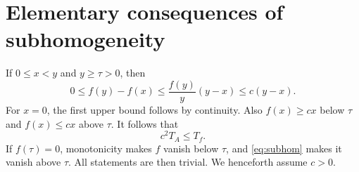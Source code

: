 \documentclass[11pt]{article}
\theoremstyle{definition}
\newcommand{\TA}{T_A}
\newcommand{\Tf}{T_f}
\begin{document}
\section{Elementary consequences of subhomogeneity}
If $0\le x<y$ and $y\ge\tau>0$, then
\begin{equation}\label{eq:lip}
 0\le f(y)-f(x)\le \frac{f(y)}y(y-x)\le c(y-x).
\end{equation}
For $x=0$, the first upper bound follows by continuity. Also $f(x)\ge cx$ below $\tau$ and $f(x)\le cx$ above $\tau$. It follows that
\begin{equation}\label{eq:tail}
 c^2\TA\le\Tf.
\end{equation}
If $f(\tau)=0$, monotonicity makes $f$ vanish below $\tau$, and \eqref{eq:subhom} makes it vanish above $\tau$. All statements are then trivial. We henceforth assume $c>0$.
\end{document}
